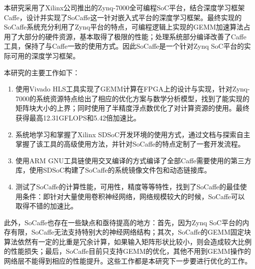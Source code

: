 

本研究采用了Xilinx公司推出的Zynq-7000全可编程SoC平台，结合深度学习框架Caffe，设计并实现了SoCaffe这一针对嵌入式平台的深度学习框架。最终实现的SoCaffe系统充分利用了Zynq平台的特点，可编程逻辑上实现的GEMM加速算法占用了大部分的硬件资源，基本取得了极限的性能；处理系统部分编译改善了Caffe工具，保持了与Caffe一致的使用方式。因此SoCaffe是一个针对Zynq SoC平台的实际可用的深度学习框架。

本研究的主要工作如下：
\begin{enumerate}
	\item 使用Vivado HLS工具实现了GEMM计算在FPGA上的设计与实现，针对Zynq-7000的系统资源特点给出了相应的优化方案与数学分析模型，找到了能实现的矩阵块大小的上界；同时使用了半精度浮点数优化了对计算资源的使用。最终获得最高12.31GFLOPS和5.42倍加速比。
	\item 系统地学习和掌握了Xilinx SDSoC开发环境的使用方式，通过文档与探索自主掌握了该工具的高级使用方法，并针对SoCaffe的特点定制了一套开发流程。
	\item 使用ARM GNU工具链使用交叉编译的方式编译了全部Caffe需要使用的第三方库，使用SDSoC构建了SoCaffe的系统镜像文件包和动态链接库。
	\item 测试了SoCaffe的计算性能，可用性，精度等等特性，找到了SoCaffe的最佳使用条件：即针对大量使用卷积神经网络，网络规模较大的时候，SoCaffe可以取得不错的加速比。
\end{enumerate}

此外，SoCaffe也存在一些缺点和亟待提高的地方：首先，因为Zynq SoC平台的内存有限，SoCaffe无法支持特别大的神经网络结构；其次，SoCaffe的GEMM固定块算法依然有一定的比重是冗余计算，如果输入矩阵形状比较小，则会造成较大比例的性能损失；最后，SoCaffe目前只支持GEMM的优化，其他不用到GEMM操作的网络层不能得到相应的性能提升。这些工作都是本研究下一步要进行优化的工作。



